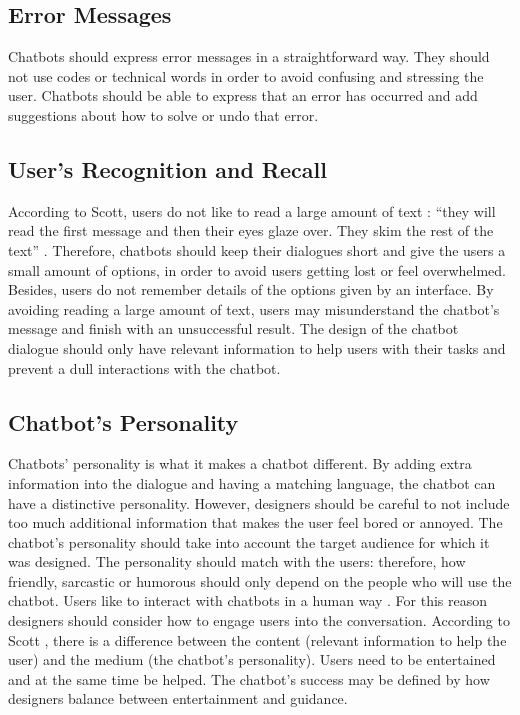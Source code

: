 \documentclass[a4paper,10pt]{article}
\begin{document}
\subsection*{Error Messages}

Chatbots should express error messages in a straightforward way. They should not use codes or technical words in order to avoid confusing and stressing the user. Chatbots should be able to express that an error has occurred and add suggestions about how to solve or undo that error.  

\subsection*{User's Recognition and Recall}

According to Scott, users do not like to read a large amount of text : ``they will read the first message and then their eyes glaze over. They skim the rest of the text” \cite{HeuristicsWebPage}. Therefore, chatbots should keep their dialogues short and give the users a small amount of options, in order to avoid users getting lost or feel overwhelmed. Besides, users do not remember details of the options given by an interface. By avoiding reading a large amount of text, users may misunderstand the chatbot’s message and finish with an unsuccessful result. The design of the chatbot dialogue should only have relevant information to help users with their tasks and prevent a dull interactions with the chatbot. 

\subsection*{Chatbot's Personality}

Chatbots’ personality is what it makes a chatbot different. By adding extra information into the dialogue and having a matching language, the chatbot can have a distinctive personality. However, designers should be careful to not include too much additional information that makes the user feel bored or annoyed. The chatbot’s personality should take into account the target audience for which it was designed. The personality should match with the users: therefore, how friendly, sarcastic or humorous should only depend on the people who will use the chatbot. Users like to interact with chatbots in a human way \cite{HeuristicsWebPage}. For this reason designers should consider how to engage users into the conversation. According to Scott \cite{HeuristicsWebPage}, there is a difference between the content (relevant information to help the user) and the medium (the chatbot’s personality). Users need to be entertained and at the same time be helped. The chatbot’s success may be defined by how designers balance between entertainment and guidance.
\end{document}
